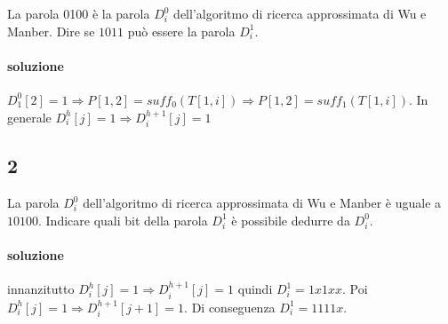 La parola 0100 \`e la parola $D^0_i$ dell'algoritmo di ricerca approssimata di Wu e Manber. Dire se $1011$ può essere
la parola $D^1_i$.

\paragraph{soluzione} $D^0_1[2] = 1 \Rightarrow P[1,2] = suff_0(T[1,i]) \Rightarrow P[1,2] = suff_1(T[1,i])$. In generale $D^h_i[j] = 1 \Rightarrow D^{h+1}_i[j] = 1$

\subsection{2}

La parola $D^0_i$ dell'algoritmo di ricerca approssimata di Wu e Manber \`e uguale a $10100$. Indicare quali bit della parola $D^1_i$ \`e possibile dedurre da $D^0_i$.

\paragraph{soluzione} innanzitutto $D^h_i[j] = 1 \Rightarrow D^{h+1}_i[j] = 1$ quindi $D^1_i = 1x1xx$. Poi $D^h_i[j] = 1 \Rightarrow D^{h+1}_i[j+1] = 1$. Di conseguenza $D^1_i = 1111x$.
